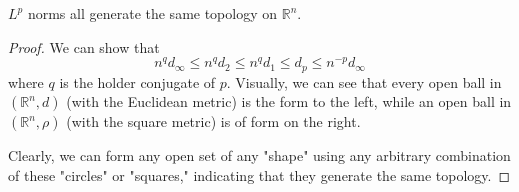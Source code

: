   \begin{theorem}
    \label{thm:lp-norms-euclidean-topology}
    $L^p$ norms all generate the same topology on $\mathbb{R}^n$. 
  \end{theorem}
  \begin{proof}
    We can show that 
    \begin{equation}
      n^q d_\infty \leq n^q d_2 \leq n^q d_1 \leq d_p \leq n^{-p} d_\infty
    \end{equation}
    where $q$ is the holder conjugate of $p$. Visually, we can see that every open ball in $(\mathbb{R}^n, d)$ (with the Euclidean metric) is the form to the left, while an open ball in $(\mathbb{R}^n, \rho)$ (with the square metric) is of form on the right. 
    \begin{center}
    \end{center}
    Clearly, we can form any open set of any "shape" using any arbitrary combination of these "circles" or "squares," indicating that they generate the same topology. 
  \end{proof}


